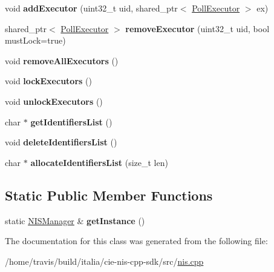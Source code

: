 \begin{DoxyCompactItemize}
\item 
\hypertarget{classNISManager_a40aeca3b6e971ecb75495e2eae06c967}{void {\bfseries add\-Executor} (uint32\-\_\-t uid, shared\-\_\-ptr$<$ \hyperlink{structPollExecutor}{Poll\-Executor} $>$ ex)}\label{classNISManager_a40aeca3b6e971ecb75495e2eae06c967}

\item 
\hypertarget{classNISManager_a5d3721ef41e981161364b5c33eeccfc6}{shared\-\_\-ptr$<$ \hyperlink{structPollExecutor}{Poll\-Executor} $>$ {\bfseries remove\-Executor} (uint32\-\_\-t uid, bool must\-Lock=true)}\label{classNISManager_a5d3721ef41e981161364b5c33eeccfc6}

\item 
\hypertarget{classNISManager_a19037ce4d2614109b7086abdab6fad95}{void {\bfseries remove\-All\-Executors} ()}\label{classNISManager_a19037ce4d2614109b7086abdab6fad95}

\item 
\hypertarget{classNISManager_a4aeb245433ea7ac918528db687b618cc}{void {\bfseries lock\-Executors} ()}\label{classNISManager_a4aeb245433ea7ac918528db687b618cc}

\item 
\hypertarget{classNISManager_a9b4f1f7c0dcc5d834913e8534097c47a}{void {\bfseries unlock\-Executors} ()}\label{classNISManager_a9b4f1f7c0dcc5d834913e8534097c47a}

\item 
\hypertarget{classNISManager_a713e9399922ebfdb0b5bbe5fee8f1bc3}{char $\ast$ {\bfseries get\-Identifiers\-List} ()}\label{classNISManager_a713e9399922ebfdb0b5bbe5fee8f1bc3}

\item 
\hypertarget{classNISManager_a56879726595d8357c09ecafe5cb074e3}{void {\bfseries delete\-Identifiers\-List} ()}\label{classNISManager_a56879726595d8357c09ecafe5cb074e3}

\item 
\hypertarget{classNISManager_ab55cd1e722e46885664f52eb883e2ead}{char $\ast$ {\bfseries allocate\-Identifiers\-List} (size\-\_\-t len)}\label{classNISManager_ab55cd1e722e46885664f52eb883e2ead}

\end{DoxyCompactItemize}
\subsection*{Static Public Member Functions}
\begin{DoxyCompactItemize}
\item 
\hypertarget{classNISManager_af6a7f2cb644fe38ef43b2ed9323506c7}{static \hyperlink{classNISManager}{N\-I\-S\-Manager} \& {\bfseries get\-Instance} ()}\label{classNISManager_af6a7f2cb644fe38ef43b2ed9323506c7}

\end{DoxyCompactItemize}


The documentation for this class was generated from the following file\-:\begin{DoxyCompactItemize}
\item 
/home/travis/build/italia/cie-\/nis-\/cpp-\/sdk/src/\hyperlink{nis_8cpp}{nis.\-cpp}\end{DoxyCompactItemize}
